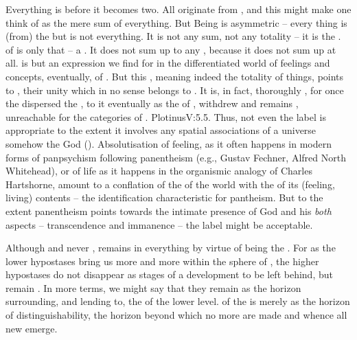 \label{sub:pantheism} \pa Everything is 
before it becomes two.  All  originate from , and this
might make one think of  as the mere sum of everything. But Being is
asymmetric -- every thing is (from) the  but  is not everything.
It is not any sum, not any  totality -- it is the .   of  is only that -- a .
It does not sum up to any , because it does not sum up at all.
 is but an expression we find for  in the
differentiated world of feelings and concepts, eventually, of .
But this , meaning indeed the totality of things, points to
, their unity which in no sense belongs to . It
is, in fact, thoroughly , for once the 
dispersed the , to  it eventually as the  of
,  withdrew and remains , unreachable
for the categories of . \citet{The First remains intact
  even when other entities spring from it.}{Plotinus}{V:5.5. Thus, not even the label
   is appropriate to the extent it involves any spatial
  associations of a universe somehow  the God (). Absolutisation of feeling, as it often happens in modern forms of
  panpsychism following panentheism (e.g., Gustav Fechner, Alfred North
  Whitehead), or of life as it happens in the organismic analogy of Charles
  Hartshorne, amount to a conflation of the  of the world
  with the  of its (feeling, living) contents -- the identification
  characteristic for pantheism. But to the extent panentheism points towards the
  intimate presence of God and his {\em both} aspects -- transcendence and
  immanence -- the label might be acceptable.}

\pa Although  and never ,  remains
 in everything by virtue of being the .
For as the lower hypostases bring us more and more within the sphere of
, the higher hypostases do not disappear as stages of a
development to be left behind, but remain .  In more 
terms, we might say that they  remain  as the horizon surrounding,
and lending  to, the  of the lower level.  of
the  is merely as the horizon of distinguishability, the horizon beyond
which no more  are made and whence all new  emerge.

